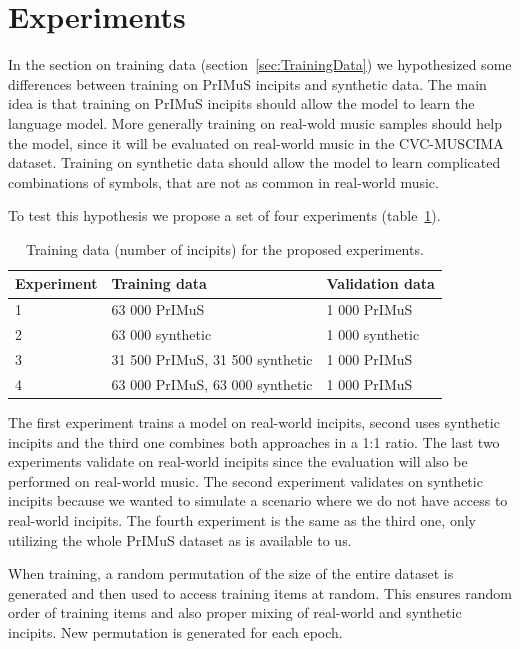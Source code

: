 \section{Experiments}

In the section on training data (section~\ref{sec:TrainingData}) we hypothesized some differences between training on PrIMuS incipits and synthetic data. The main idea is that training on PrIMuS incipits should allow the model to learn the language model. More generally training on real-wold music samples should help the model, since it will be evaluated on real-world music in the CVC-MUSCIMA dataset. Training on synthetic data should allow the model to learn complicated combinations of symbols, that are not as common in real-world music.

To test this hypothesis we propose a set of four experiments (table~\ref{tab6:ExperimentData}).

\begin{table}[h] \centering
\begin{tabular}{lll}
\toprule
\textbf{Experiment} & \textbf{Training data} & \textbf{Validation data} \\
\midrule
1 & 63 000 PrIMuS                   & 1 000 PrIMuS    \\
2 & 63 000 synthetic                & 1 000 synthetic \\
3 & 31 500 PrIMuS, 31 500 synthetic & 1 000 PrIMuS    \\
4 & 63 000 PrIMuS, 63 000 synthetic & 1 000 PrIMuS    \\
\bottomrule
\end{tabular}
\caption{Training data (number of incipits) for the proposed experiments.}
\label{tab6:ExperimentData}
\end{table}

The first experiment trains a model on real-world incipits, second uses synthetic incipits and the third one combines both approaches in a 1:1 ratio. The last two experiments validate on real-world incipits since the evaluation will also be performed on real-world music. The second experiment validates on synthetic incipits because we wanted to simulate a scenario where we do not have access to real-world incipits. The fourth experiment is the same as the third one, only utilizing the whole PrIMuS dataset as is available to us.

When training, a random permutation of the size of the entire dataset is generated and then used to access training items at random. This ensures random order of training items and also proper mixing of real-world and synthetic incipits. New permutation is generated for each epoch.

